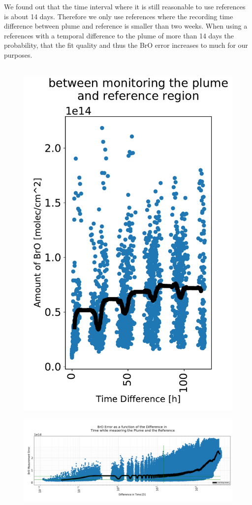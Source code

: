 \documentclass  [
  paper    = a4,
  BCOR     = 10mm,
  twoside,
  fontsize = 12pt,
  fleqn,
  toc      = bibnumbered,
  toc      = listofnumbered,
  numbers  = noendperiod,
  headings = normal,
  listof   = leveldown,
  version  = 3.03
]                                       {scrreprt}
\begin{document}
	We found out that the time interval where it is still reasonable to use references is about 14 days. Therefore we only use references where the recording time difference between plume and reference is smaller than two weeks. When using a references with a temporal difference to the plume of more than 14 days the probability, that the fit quality and thus the BrO error increases to much for our purposes. \\
	\\
	\begin{figure}
		\centering
		\includegraphics[width=0.7\linewidth]{Bilder/Datum_100h}
		\caption{}
		\label{fig:datum100h}
	\end{figure}	
	\begin{figure}[h!]
		\includegraphics[width=1.1\linewidth]{Bilder/Datum}
		\caption{}
		\label{fig:dat}
	\end{figure}
\end{document}
